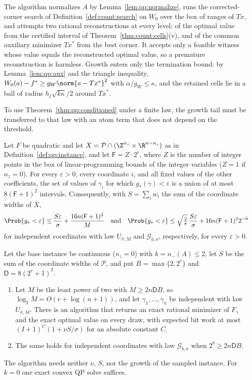 The algorithm normalizes $A$ by Lemma~\ref{lem:qp:normalize}, runs the
corrected-corner search of Definition~\ref{def:count:search} on $W_0$ over the
box of ranges of $Tx$, and attempts two rational reconstructions at every
level: of the optimal value from the certified interval of
Theorem~\ref{thm:count:cells}(v), and of the common auxiliary minimizer $Tx^*$
from the best corner. It accepts only a feasible witness whose value equals
the reconstructed optimal value, so a premature reconstruction is harmless.
Growth enters only the termination bound: by Lemma~\ref{lem:qp:aux} and the
triangle inequality, $W_0(a)-f^*\ge g_W\norm{a-Tx^*}^2$ with
$\alpha/g_W\le\kappa$, and the retained cells lie in a ball of radius
$h_j\sqrt{k\kappa}/2$ around $Tx^*$.

To use Theorem~\ref{thm:qp:conditioned} under a finite law, the growth tail
must be transferred to that law with an atom term that does not depend on the
threshold.

\begin{lemma}\label{lem:qp:growth-sections}
Let $F$ be quadratic and let $X=\mathcal P\cap(\Z^{n_z}\times\R^{n-n_z})$ as in
Definition~\ref{def:qp:instance}, and let $\mathsf F=Z\cdot2^r$, where $Z$ is
the number of integer points in the box of linear-programming bounds of the
integer variables ($Z=1$ if $n_z=0$). For every $\varepsilon>0$, every
coordinate $i$, and all fixed values of the other coefficients, the set of
values of $\gamma_i$ for which $g_*(\gamma)<\varepsilon$ is a union of at most
$8(\mathsf F+1)^2$ intervals. Consequently, with $S=\sum_iw_i$ the sum of the
coordinate widths of $X$,
\[
 \Prob\{g_*<\varepsilon\}\le\frac{S\varepsilon}\sigma+\frac{16n(\mathsf F+1)^2}M
 \quad\text{and}\quad
 \Prob\{g_*<\varepsilon\}\le\sqrt{\tfrac2\pi}\,\frac{S\varepsilon}\sigma+16n(\mathsf F+1)^22^{-b}
\]
for independent coordinates with law $U_{\sigma,M}$ and
$\mathcal G_{b,\sigma}$, respectively, for every $\varepsilon>0$.
\end{lemma}

\begin{theorem}\label{thm:qp:two}
Let the base instance be continuous ($n_z=0$) with $k=n_-(A)\le2$, let
$S$ be the sum of the coordinate widths of $\mathcal P$, and put
$B=\max\{2,2^r\}$ and $\mathsf D=8(2^r+1)^2$.
\begin{enumerate}[label=(\alph*)]
\item Let $M$ be the least power of two with $M\ge2n\mathsf DB$, so
 $\log_2M=O(r+\log(n+1))$, and let $\gamma_1,\dots,\gamma_n$ be independent
 with law $U_{\sigma,M}$. There is an algorithm that returns an exact
 rational minimizer of $F_\gamma$ and the exact optimal value on every draw,
 with expected bit work at most $(I+1)^{C}(1+\nu S/\sigma)$ for an absolute
 constant $C$.
\item The same holds for independent coordinates with law
 $\mathcal G_{b,\sigma}$ when $2^b\ge2n\mathsf DB$.
\end{enumerate}
The algorithm needs neither $\nu$, $S$, nor the growth of the sampled
instance. For $k=0$ one exact convex QP solve suffices.
\end{theorem}

